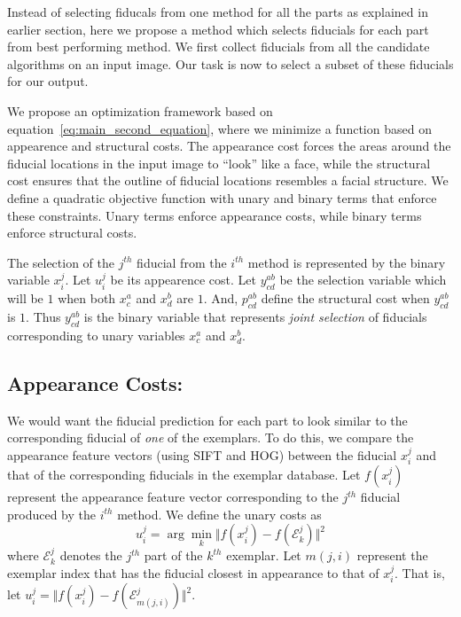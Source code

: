 \label{subsec:optimization}
Instead of selecting fiducals from one method for all the parts as explained in earlier section,
here we propose a method which selects fiducials for each part from best performing method. 
We first collect fiducials from all the candidate algorithms on an input image. Our task is now to
select a subset of these fiducials for our output. 

We propose an optimization framework based on equation~\ref{eq:main_second_equation},
 where we minimize a function based on appearence and structural
costs. The appearance cost forces the areas around the fiducial locations in the input image 
to ``look'' like a face, while the structural cost ensures that the outline of fiducial locations 
resembles a facial structure. We define a quadratic objective function with unary and binary terms
that enforce these constraints. Unary terms enforce appearance costs, while binary terms enforce
structural costs.

The selection of the $j^{th}$ fiducial from the
$i^{th}$ method is represented by the binary variable $x_i^j$.  Let $u_i^j$ be its
appearence cost. Let $y_{cd}^{ab}$ be the selection variable which will be $1$ when both $x_c^a$
and $x_d^b$ are $1$. And, $p_{cd}^{ab}$ define the structural cost when $y_{cd}^{ab}$ is $1$.
Thus $y^{ab}_{cd}$ is the binary variable that represents \emph{joint selection} of fiducials
corresponding to unary variables $x^a_c$ and $x^b_d$.

\subsection{Appearance Costs:} We would want the fiducial prediction for each part to look similar to the corresponding fiducial  
of \emph{one} of the exemplars. To do this, we compare the appearance feature vectors (using SIFT
and HOG) between the fiducial $x_i^j$ and that of the corresponding fiducials in the exemplar
database.
Let $f(x^j_i)$ represent the appearance feature vector corresponding to the $j^{th}$ fiducial
produced by the $i^{th}$ method. We define the unary costs as
\begin{equation}
  u^j_i = \arg\min_k \Vert f(x^j_i) - f(\mathcal{E}^j_k) \Vert^2
\end{equation}
where $\mathcal{E}^j_k$ denotes the $j^{th}$ part of the $k^{th}$ exemplar. Let $m(j, i)$ represent
the exemplar index that has the fiducial closest in appearance to that of $x^j_i$. That is, 
let $u^j_i = \Vert f(x^j_i) - f(\mathcal{E}^j_{m(j,i)}) \Vert^2$.
